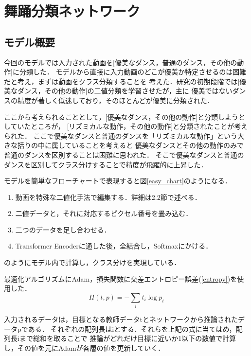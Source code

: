 \section{舞踊分類ネットワーク}

\subsection{モデル概要}
今回のモデルでは入力された動画を[優美なダンス，普通のダンス，その他の動作]に分類した．
モデルから直接に入力動画のどこが優美か特定させるのは困難だと考え，まずは動画をクラス分類することを
考えた．研究の初期段階では[優美なダンス，その他の動作]の二値分類を学習させたが，主に
優美ではないダンスの精度が著しく低迷しており，そのほとんどが優美に分類された．

ここから考えられることとして，[優美なダンス，その他の動作]と分類しようとしていたところが，
[リズミカルな動作，その他の動作]と分類されたことが考えられた．
ここで優美なダンスと普通のダンスを「リズミカルな動作」という大きな括りの中に属していることを考えると
優美なダンスとその他の動作のみで普通のダンスを区別することは困難に思われた．
そこで優美なダンスと普通のダンスを区別してクラス分けすることで精度が飛躍的に上昇した．

モデルを簡単なフローチャートで表現すると図\ref{easy_chart}のようになる．
\begin{enumerate}
  \item 動画を特殊な二値化手法で編集する．詳細は2.2節で述べる．
  \item 二値データと，それに対応するピクセル番号を畳み込む．
  \item 二つのデータを足し合わせる．
  \item Transformer Encoderに通した後，全結合し，Softmaxにかける．
\end{enumerate}
のようにモデル内で計算し，クラス分けを実現している．

最適化アルゴリズムにAdam\cite{adam}，損失関数に交差エントロピー誤差(\ref{entropy})を使用した．
\begin{equation}
  H(t, p) = -\sum_{i}t_i\log p_i
  \label{entropy}
\end{equation}

入力されるデータは，目標となる教師データtとネットワークから推論されたデータpである．
それぞれの配列長はiとする．それらを上記の式に当てはめ，配列長iまで総和を取ることで
推論がどれだけ目標に近いか1以下の数値で計算し，その値を元にAdamが各層の値を更新していく．

\clearpage

